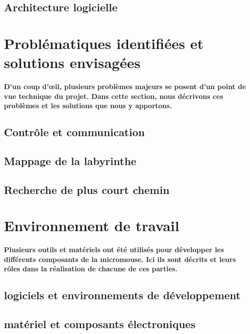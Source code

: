 \subsection{Architecture logicielle} \label{subsec:vueLogicielle}

\section{Problématiques identifiées et solutions envisagées} \label{sec:problemesSolutions}

\paragraph{
D'un coup d'œil, plusieurs problèmes majeurs se posent d'un point de vue technique du projet.
Dans cette section, nous décrivons ces problèmes et les solutions que nous y apportons.
}

\subsection{Contrôle et communication}

\subsection{Mappage de la labyrinthe}

\subsection{Recherche de plus court chemin}

\section{Environnement de travail} \label{sec:environnement}

\paragraph{
Plusieurs outils et matériels ont été utilisés pour développer les différents composants
de la micromouse. Ici ils sont décrits et leurs rôles dans la réalisation de chacune de ces parties.
}

\subsection{logiciels et environnements de développement}

\subsection{matériel et composants électroniques}